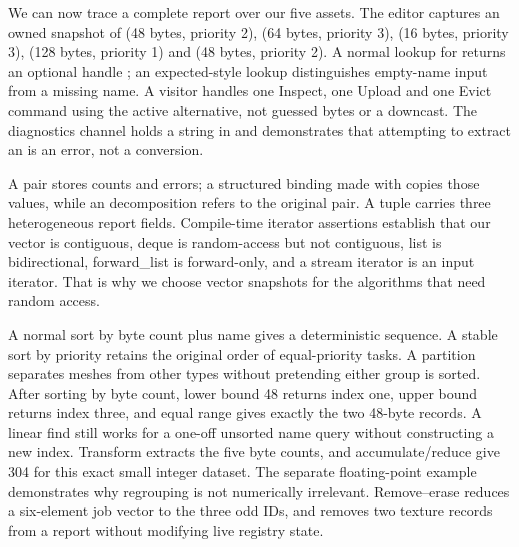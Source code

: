 \hypertarget{01-foundations-i-ch006-putting-the-entire-pipeline-together-without-losing-the-guarantees-we-already-earned}{}

We can now trace a complete report over our five assets. The editor captures an owned snapshot of  (48 bytes, priority 2),  (64 bytes, priority 3),  (16 bytes, priority 3),  (128 bytes, priority 1) and  (48 bytes, priority 2). A normal lookup for  returns an optional handle ; an expected-style lookup distinguishes empty-name input from a missing name. A visitor handles one Inspect, one Upload and one Evict command using the active  alternative, not guessed bytes or a downcast. The diagnostics channel holds a string in  and demonstrates that attempting to extract an  is an error, not a conversion.

A pair stores counts and errors; a structured binding made with  copies those values, while an  decomposition refers to the original pair. A tuple carries three heterogeneous report fields. Compile-time iterator assertions establish that our vector is contiguous, deque is random-access but not contiguous, list is bidirectional, forward\_list is forward-only, and a stream iterator is an input iterator. That is why we choose vector snapshots for the algorithms that need random access.

A normal sort by byte count plus name gives a deterministic sequence. A stable sort by priority retains the original order of equal-priority tasks. A partition separates meshes from other types without pretending either group is sorted. After sorting by byte count, lower bound 48 returns index one, upper bound returns index three, and equal range gives exactly the two 48-byte records. A linear find still works for a one-off unsorted name query without constructing a new index. Transform extracts the five byte counts, and accumulate/reduce give 304 for this exact small integer dataset. The separate floating-point example demonstrates why regrouping is not numerically irrelevant. Remove--erase reduces a six-element job vector to the three odd IDs, and  removes two texture records from a report without modifying live registry state.

